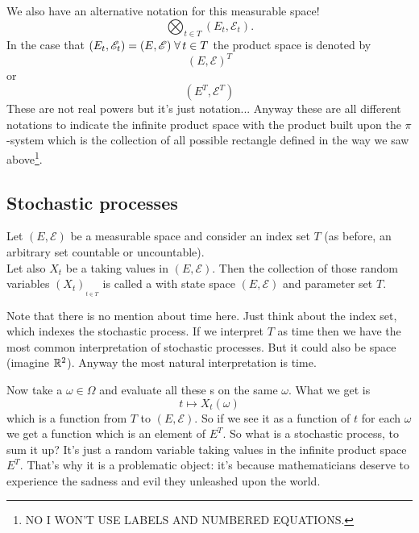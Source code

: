 \documentclass{report}
\begin{document}
We also have an alternative notation for this measurable space!
\[\bigotimes_{t\in T}(E_t,\mathscr{E}_t).\]
In the case that $(E_t,\mathscr{E}_t)=(E,\mathscr{E})\;\forall\, t\in T$ the product space is denoted by
\[(E,\mathscr{E})^T\] or 
\[(E^T,\mathscr{E}^T)\]
These are not real powers but it's just notation... Anyway these are all different notations to indicate the infinite product space with the product \sa{} built upon the $\pi$-system which is the collection of all possible rectangle defined in the way we saw above\footnote{NO I WON'T USE LABELS AND NUMBERED EQUATIONS.}.
\subsection{Stochastic processes}
\begin{definition}
	Let $(E,\mathscr{E})$ be a measurable space and consider an index set $T$ (as before, an arbitrary set countable or uncountable).\\
	Let also $X_t$ be a \rv{} taking values in $(E,\mathscr{E})$. Then the collection of those random variables $(X_t)_{_{t\in T}}$ is called a  with state space $(E,\mathscr{E})$ and parameter set $T$.
\end{definition}
Note that there is no mention about time here. Just think about the index set, which indexes the stochastic process. If we interpret $T$ as time then we have the most common interpretation of stochastic processes. But it could also be space (imagine $\mathbb{R}^2$). Anyway the most natural interpretation is time.\par
Now take a $\omega\in\Omega$ and evaluate all these \rv s on the same $\omega$. What we get is
\[t\mapsto X_t(\omega)\]
which is a function from $T$ to $(E,\mathscr{E})$. So if we see it as a function of $t$ for each $\omega$ we get a function which is an element of $E^T$. So what is a stochastic process, to sum it up? It's just a random variable taking values in the infinite product space $E^T$. That's why it is a problematic object: it's because mathematicians deserve to experience the sadness and evil they unleashed upon the world. 
\end{document}
